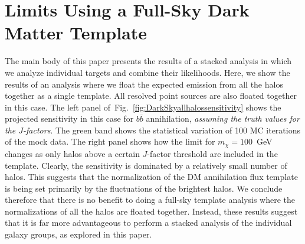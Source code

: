  
\section{Limits Using a Full-Sky Dark Matter Template}
\label{app:inflimitimpact}

The main body of this paper presents the results of a stacked analysis in which we analyze individual targets and combine their likelihoods.  Here, we show the results of an analysis where we float the expected emission from all the halos together as a single template.  All resolved point sources are also floated together in this case. The left panel of~Fig.~\ref{fig:DarkSkyallhalossensitivity} shows the projected sensitivity in this case for $b\bar b$ annihilation, \emph{assuming the truth values for the $J$-factors}.  The green band shows the statistical variation of 100 MC iterations of the mock data.  The right panel shows how the limit for $m_\chi = 100$~GeV changes as only halos above a certain $J$-factor threshold are included in the template. Clearly, the sensitivity is dominated by a relatively small number of halos.  This suggests that the normalization of the DM annihilation flux template is being set primarily by the fluctuations of the brightest halos.  We conclude therefore that there is no benefit to doing a full-sky template analysis where the normalizations of all the halos are floated together.  Instead, these results suggest that it is far more advantageous to perform a stacked analysis of the individual galaxy groups, as  explored in this paper. 